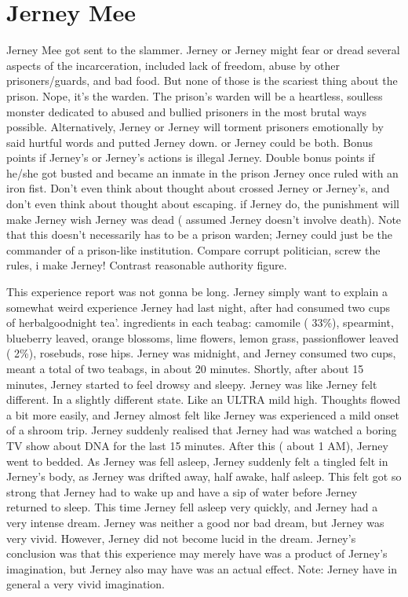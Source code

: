 \documentclass[12pt]{book}
\begin{document}
\chapter{Jerney Mee}

Jerney Mee got sent to the slammer. Jerney or Jerney might fear or dread several aspects of the incarceration, included lack of freedom, abuse by other prisoners/guards, and bad food. But none of those is the scariest thing about the prison. Nope, it's the warden. The prison's warden will be a heartless, soulless monster dedicated to abused and bullied prisoners in the most brutal ways possible. Alternatively, Jerney or Jerney will torment prisoners emotionally by said hurtful words and putted Jerney down. or Jerney could be both. Bonus points if Jerney's or Jerney's actions is illegal Jerney. Double bonus points if he/she got busted and became an inmate in the prison Jerney once ruled with an iron fist. Don't even think about thought about crossed Jerney or Jerney's, and don't even think about thought about escaping. if Jerney do, the punishment will make Jerney wish Jerney was dead ( assumed Jerney doesn't involve death). Note that this doesn't necessarily has to be a prison warden; Jerney could just be the commander of a prison-like institution. Compare corrupt politician, screw the rules, i make Jerney! Contrast reasonable authority figure.



This experience report was not gonna be long. Jerney simply want to explain a somewhat weird experience Jerney had last night, after had consumed two cups of herbalgoodnight tea'. ingredients in each teabag: camomile ( 33\%), spearmint, blueberry leaved, orange blossoms, lime flowers, lemon grass, passionflower leaved ( 2\%), rosebuds, rose hips. Jerney was midnight, and Jerney consumed two cups, meant a total of two teabags, in about 20 minutes. Shortly, after about 15 minutes, Jerney started to feel drowsy and sleepy. Jerney was like Jerney felt different. In a slightly different state. Like an ULTRA mild high. Thoughts flowed a bit more easily, and Jerney almost felt like Jerney was experienced a mild onset of a shroom trip. Jerney suddenly realised that Jerney had was watched a boring TV show about DNA for the last 15 minutes. After this ( about 1 AM), Jerney went to bedded. As Jerney was fell asleep, Jerney suddenly felt a tingled felt in Jerney's body, as Jerney was drifted away, half awake, half asleep. This felt got so strong that Jerney had to wake up and have a sip of water before Jerney returned to sleep. This time Jerney fell asleep very quickly, and Jerney had a very intense dream. Jerney was neither a good nor bad dream, but Jerney was very vivid. However, Jerney did not become lucid in the dream. Jerney's conclusion was that this experience may merely have was a product of Jerney's imagination, but Jerney also may have was an actual effect. Note: Jerney have in general a very vivid imagination.
\end{document}
